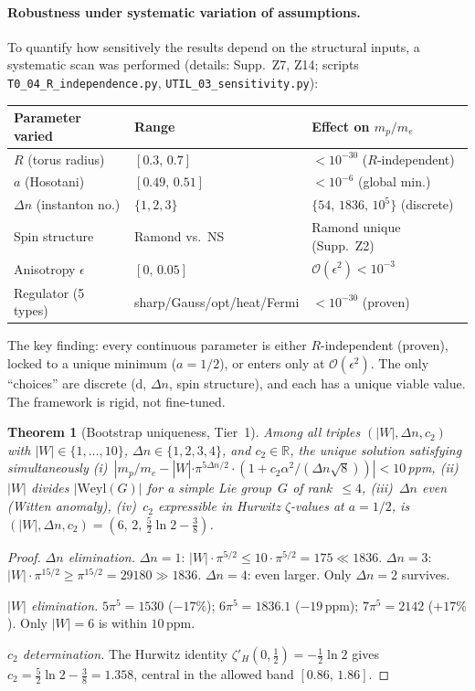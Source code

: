 \documentclass[11pt,a4paper]{article}
\newtheorem{theorem}{Theorem}
\theoremstyle{definition}
\theoremstyle{remark}
\begin{document}
\paragraph{Robustness under systematic variation of assumptions.}
To quantify how sensitively the results depend on the structural inputs,
a systematic scan was performed (details: Supp.~Z7, Z14;
scripts \texttt{T0\_04\_R\_independence.py},
\texttt{UTIL\_03\_sensitivity.py}):
\begin{center}
\renewcommand{\arraystretch}{1.15}\small
\begin{tabular}{lll}
\toprule
\textbf{Parameter varied} & \textbf{Range} & \textbf{Effect on $m_p/m_e$}\\
\midrule
$R$ (torus radius) & $[0.3,\,0.7]$ & $<\!10^{-30}$ ($R$-independent)\\
$a$ (Hosotani) & $[0.49,\,0.51]$ & $<\!10^{-6}$ (global min.)\\
$\Delta n$ (instanton no.) & $\{1,2,3\}$ & $\{54,\,1836,\,10^5\}$ (discrete)\\
Spin structure & Ramond vs.\ NS & Ramond unique (Supp.~Z2)\\
Anisotropy $\epsilon$ & $[0,\,0.05]$ & $\mathcal{O}(\epsilon^2)<10^{-3}$\\
Regulator (5 types) & sharp/Gauss/opt/heat/Fermi & $<\!10^{-30}$ (proven)\\
\bottomrule
\end{tabular}
\end{center}
\noindent
The key finding: every continuous parameter is either
$R$-independent (proven), locked to a unique minimum ($a\!=\!1/2$),
or enters only at $\mathcal{O}(\epsilon^2)$.  The only
``choices'' are discrete (d, $\Delta n$, spin structure), and each
has a unique viable value.  The framework is rigid, not fine-tuned.

\begin{theorem}[Bootstrap uniqueness, Tier~1]
\label{thm:bootstrap}
Among all triples $(|W|,\Delta n, c_2)$ with $|W|\in\{1,\ldots,10\}$,
$\Delta n\in\{1,2,3,4\}$, and $c_2\in\mathbb{R}$, the unique solution
satisfying simultaneously
(i)~$|m_p/m_e - |W|\cdot\pi^{5\Delta n/2}\cdot(1+c_2\alpha^2/(\Delta n\sqrt{8}))| < 10\,$ppm,
(ii)~$|W|$ divides $|\mathrm{Weyl}(G)|$ for a simple Lie group~$G$ of rank~$\leq 4$,
(iii)~$\Delta n$ even (Witten anomaly),
(iv)~$c_2$ expressible in Hurwitz $\zeta$-values at $a=1/2$,
is $(|W|,\Delta n, c_2)=(6,\,2,\,\tfrac52\ln 2-\tfrac38)$.
\end{theorem}

\begin{proof}
\emph{$\Delta n$ elimination.}
$\Delta n=1$: $|W|\cdot\pi^{5/2}\leq 10\cdot\pi^{5/2}=175 \ll 1836$.
$\Delta n=3$: $|W|\cdot\pi^{15/2}\geq\pi^{15/2}=29180\gg 1836$.
$\Delta n=4$: even larger. Only $\Delta n=2$ survives.

\emph{$|W|$ elimination.}
$5\pi^5=1530$ ($-17\%$); $6\pi^5=1836.1$ ($-19\,$ppm); $7\pi^5=2142$ ($+17\%$).
Only $|W|=6$ is within $10\,$ppm.

\emph{$c_2$ determination.}
The Hurwitz identity $\zeta'_H(0,\tfrac12)=-\tfrac12\ln 2$ gives
$c_2=\tfrac52\ln 2-\tfrac38=1.358$, central in the allowed band
$[0.86,\,1.86]$.
\end{proof}
\end{document}
